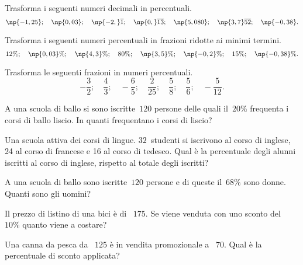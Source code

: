 \begin{esercizio}
 \label{ese:3.80}
Trasforma i seguenti numeri decimali in percentuali.
\[\np{-1,25};\quad \np{0,03};\quad \np{-2,}\overline{1};\quad \np{0,}\overline{13};\quad \np{5,080};\quad \np{3,7}\overline{52};\quad \np{-0,38}.\]
\end{esercizio}

\begin{esercizio}
 \label{ese:3.81}
Trasforma i seguenti numeri percentuali in frazioni ridotte ai minimi termini.
\[12\%;\quad \np{0,03}\%;\quad \np{4,3}\%;\quad 80\%;\quad \np{3,5}\%;\quad \np{-0,2}\%;\quad 15\%;\quad\np{-0,38}\%.\]
\end{esercizio}

\begin{esercizio}
\label{ese:3.82}
Trasforma le seguenti frazioni in numeri percentuali.
\[-\frac{3}{2};\quad\frac{4}{3};\quad-\frac{6}{5};\quad\frac{2}{25};\quad\frac{5}{8};
\quad\frac{5}{6};\quad-\frac{5}{12}.\]
\end{esercizio}

\begin{esercizio}
 \label{ese:3.83}
A una scuola di ballo si sono iscritte~$120$ persone delle quali il~$20\%$ frequenta i corsi di ballo liscio.
In quanti frequentano i corsi di liscio?
\end{esercizio}

\begin{esercizio}
 \label{ese:3.84}
Una scuola attiva dei corsi di lingue. $32$~studenti si iscrivono al corso di inglese, 24 al
corso di francese e 16 al corso di tedesco.
Qual è la percentuale degli alunni iscritti al corso di inglese, rispetto al totale degli iscritti?
\end{esercizio}

\begin{esercizio}
 \label{ese:3.85}
A una scuola di ballo sono iscritte~$120$ persone e di queste il~$68\%$ sono donne. Quanti sono gli uomini?
\end{esercizio}

\begin{esercizio}
 \label{ese:3.86}
 Il prezzo di listino di una bici è di \officialeuro~$175$. Se viene venduta con uno sconto del~$10\%$ quanto viene a costare?
\end{esercizio}

\begin{esercizio}[\Ast]
 \label{ese:3.87}
Una canna da pesca da \officialeuro~$125$ è in vendita promozionale a \officialeuro~$70$.
Qual è la percentuale di sconto applicata?
\end{esercizio}

